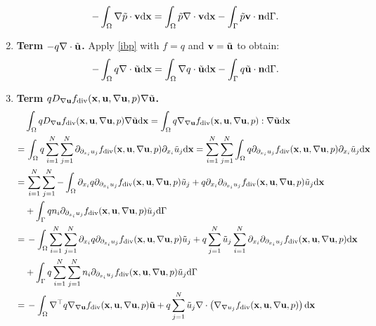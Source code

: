 \documentclass[oneside,11pt]{book}
\numberwithin{equation}{section}
\begin{document}
\begin{enumerate}[leftmargin=0mm]
    \begin{align*}
        -\int_\Omega \nabla\tilde{p}\cdot{\bf v}{\rm d}{\bf x} = \int_\Omega \tilde{p}\nabla\cdot{\bf v}{\rm d}{\bf x} - \int_\Gamma \tilde{p}{\bf v}\cdot{\bf n}{\rm d}\Gamma.
    \end{align*}
    \item\textbf{ Term $-q\nabla\cdot\tilde{\bf u}$.} Apply \eqref{ibp} with $f = q$ and ${\bf v} = \tilde{\bf u}$ to obtain:
    \begin{align*}
        -\int_\Omega q\nabla\cdot\tilde{\bf u}{\rm d}{\bf x} = \int_\Omega \nabla q\cdot\tilde{\bf u}{\rm d}{\bf x} - \int_\Gamma q\tilde{\bf u}\cdot{\bf n}{\rm d}\Gamma.
    \end{align*}
    \item \textbf{Term $qD_{\nabla{\bf u}}f_{\rm div}({\bf x},{\bf u},\nabla{\bf u},p)\nabla\tilde{\bf u}$.}
    \begin{align*}
        &\int_\Omega qD_{\nabla{\bf u}}f_{\rm div}({\bf x},{\bf u},\nabla{\bf u},p)\nabla\tilde{\bf u}{\rm d}{\bf x} = \int_\Omega q\nabla_{\nabla{\bf u}}f_{\rm div}({\bf x},{\bf u},\nabla{\bf u},p):\nabla\tilde{\bf u}{\rm d}{\bf x}\\
        =&\, \int_\Omega q\sum_{i=1}^N\sum_{j=1}^N \partial_{\partial_{x_i}u_j}f_{\rm div}({\bf x},{\bf u},\nabla{\bf u},p)\partial_{x_i}\tilde{u}_j{\rm d}{\bf x} = \sum_{i=1}^N\sum_{j=1}^N \int_\Omega q\partial_{\partial_{x_i}u_j}f_{\rm div}({\bf x},{\bf u},\nabla{\bf u},p)\partial_{x_i}\tilde{u}_j{\rm d}{\bf x}\\
        =&\, \sum_{i=1}^N\sum_{j=1}^N -\int_\Omega \partial_{x_i}q\partial_{\partial_{x_i}u_j}f_{\rm div}({\bf x},{\bf u},\nabla{\bf u},p)\tilde{u}_j + q\partial_{x_i}\partial_{\partial_{x_i}u_j}f_{\rm div}({\bf x},{\bf u},\nabla{\bf u},p)\tilde{u}_j{\rm d}{\bf x}\\
        &+ \int_\Gamma qn_i\partial_{\partial_{x_i}u_j}f_{\rm div}({\bf x},{\bf u},\nabla{\bf u},p)\tilde{u}_j{\rm d}\Gamma\\
        =&\, -\int_\Omega \sum_{i=1}^N\sum_{j=1}^N \partial_{x_i}q\partial_{\partial_{x_i}u_j}f_{\rm div}({\bf x},{\bf u},\nabla{\bf u},p)\tilde{u}_j + q\sum_{j=1}^N \tilde{u}_j\sum_{i=1}^N \partial_{x_i}\partial_{\partial_{x_i}u_j}f_{\rm div}({\bf x},{\bf u},\nabla{\bf u},p){\rm d}{\bf x}\\
        &+ \int_\Gamma q\sum_{i=1}^N\sum_{j=1}^N n_i\partial_{\partial_{x_i}u_j}f_{\rm div}({\bf x},{\bf u},\nabla{\bf u},p)\tilde{u}_j{\rm d}\Gamma\\
        =&\, -\int_\Omega \nabla^\top q\nabla_{\nabla{\bf u}}f_{\rm div}({\bf x},{\bf u},\nabla{\bf u},p)\tilde{\bf u} + q\sum_{j=1}^N \tilde{u}_j\nabla\cdot\left(\nabla_{\nabla u_j}f_{\rm div}({\bf x},{\bf u},\nabla{\bf u},p)\right){\rm d}{\bf x}\\

\end{align*}
\end{enumerate}
\end{document}
